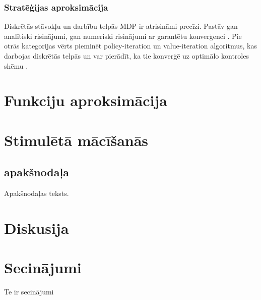 \documentclass{ludis} %
\begin{document}
\subsection{Stratēģijas aproksimācija}

Diskrētās stāvokļu un darbību telpās MDP ir atrisināmi precīzi. Pastāv gan analītiski risinājumi, gan numeriski %
risinājumi ar garantētu konverģenci \autocite{Barto}. %
Pie otrās kategorijas vērts pieminēt policy-iteration un value-iteration algoritmus, kas darbojas diskrētās telpās un var pierādīt, ka tie konverģē uz optimālo kontroles shēmu \autocite{Barto}. %

\chapter{Funkciju aproksimācija}
\chapter{Stimulētā mācīšanās}
\section{apakšnodaļa}
Apakšnodaļas teksts.

\chapter{Diskusija}
\chapter{Secinājumi}
Te ir secinājumi

\printbibliography
\end{document}

